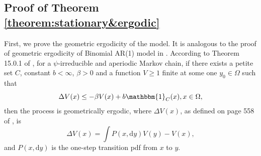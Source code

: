 \documentclass{article}
\theoremstyle{definition}
\begin{document}
\subsection{Proof of Theorem \ref{theorem:stationary&ergodic}}
\label{app: stationary ergodicity}
First, we prove the geometric ergodicity of the model. It is analogous to the proof of geometric ergodicity of Binomial AR(1) model in \cite{Liu_2025}. According to Theorem 15.0.1 of \cite{meyn1993markov}, for a $\psi$-irreducible and aperiodic Markov chain, if there exists a petite set $C$, constant $b <\infty$, $\beta>0$ and a function $V \geq 1$ finite at some one $y_0 \in \Omega$ such that
\begin{equation*}
    \Delta V(x) \leq -\beta V(x) +b \mathbbm{1}_C(x), x \in \Omega,
\end{equation*}
then the process is geometrically ergodic, where $\Delta V(x)$, as defined on page 558 of \cite{meyn1993markov}, is 
\begin{equation*}
    \Delta V(x) = \int P(x,\text{d}y)V(y)-V(x),
\end{equation*}
and $P(x, \text{d}y)$ is the one-step transition pdf from $x$ to $y$.
\end{document}
